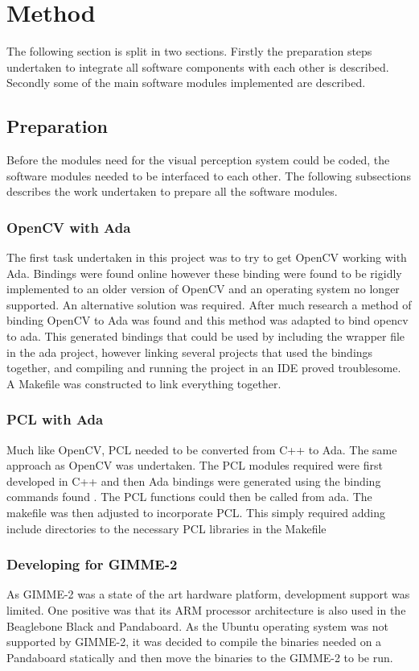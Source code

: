 \section{Method}\label{sec:method}
The following section is split in two sections. Firstly the preparation steps undertaken to integrate all software components with each other is described. Secondly some of the main software modules implemented are described.
\subsection{Preparation}
Before the modules need for the visual perception system could be coded, the software modules needed to be interfaced to each other. The following subsections describes the work undertaken to prepare all the software modules.
\subsubsection{OpenCV with Ada}
The first task undertaken in this project was to try to get OpenCV working with Ada. Bindings were found online \cite{web:oldAdaBindings} however these binding were found to be rigidly implemented to an older version of OpenCV and an operating system no longer supported. An alternative solution was required. After much research a method of binding OpenCV to Ada was found \cite{web:newAdaBindings} and this method was adapted to bind opencv to ada. This generated bindings that could be used by including the wrapper file in the ada project, however linking several projects that used the bindings together, and compiling and running the project in an IDE proved troublesome. A Makefile was constructed to link everything together.

\subsubsection{PCL with Ada}
Much like OpenCV, PCL needed to be converted from C++ to Ada. The same approach as OpenCV was undertaken. The PCL modules required were first developed in C++ and then Ada bindings were generated using the binding commands found \cite{web:newAdaBindings}. The PCL functions could then be called from ada. The makefile was then adjusted to incorporate PCL. This simply required adding include directories to the necessary PCL libraries in the Makefile 

\subsubsection{Developing for GIMME-2}
As GIMME-2 was a state of the art hardware platform, development support was limited. One positive was that its ARM processor architecture is also used in the Beaglebone Black and Pandaboard. As the Ubuntu operating system was not supported by GIMME-2, it was decided to compile the binaries needed on a Pandaboard statically and then move the binaries to the GIMME-2 to be run.

